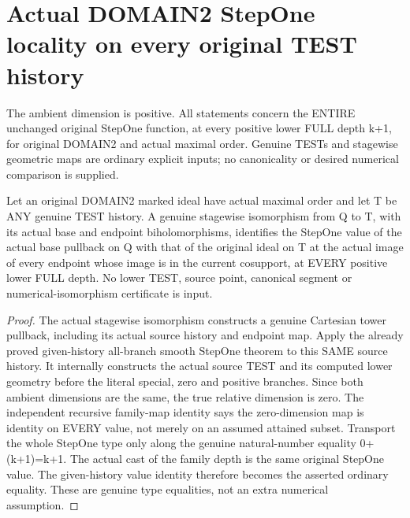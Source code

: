 \section{Actual DOMAIN2 StepOne locality on every original TEST history}

The ambient dimension is positive. All statements concern the ENTIRE
unchanged original StepOne function, at every positive lower FULL depth
k+1, for original DOMAIN2 and actual maximal order. Genuine TESTs and
stagewise geometric maps are ordinary explicit inputs; no canonicality
or desired numerical comparison is supplied.

\begin{theorem}
\label{hir:original-bound-two-stepone-tower-iso-values}
\leanok
Let an original DOMAIN2 marked ideal have actual maximal order and let T
be ANY genuine TEST history. A genuine stagewise isomorphism from Q to T,
with its actual base and endpoint biholomorphisms, identifies the StepOne
value of the actual base pullback on Q with that of the original ideal on
T at the actual image of every endpoint whose image is in the current
cosupport, at EVERY positive lower FULL depth. No lower TEST, source
point, canonical segment or numerical-isomorphism certificate is input.
\end{theorem}
\begin{proof}
The actual stagewise isomorphism constructs a genuine Cartesian tower
pullback, including its actual source history and endpoint map. Apply the
already proved given-history all-branch smooth StepOne theorem to this
SAME source history. It internally constructs the actual source TEST and
its computed lower geometry before the literal special, zero and positive
branches. Since both ambient dimensions are the same, the true relative
dimension is zero. The independent recursive family-map identity says the
zero-dimension map is identity on EVERY value, not merely on an assumed
attained subset. Transport the whole StepOne type only along the genuine
natural-number equality 0+(k+1)=k+1. The actual cast of the family depth
is the same original StepOne value. The given-history value identity
therefore becomes the asserted ordinary equality. These are genuine type
equalities, not an extra numerical assumption.
\end{proof}

